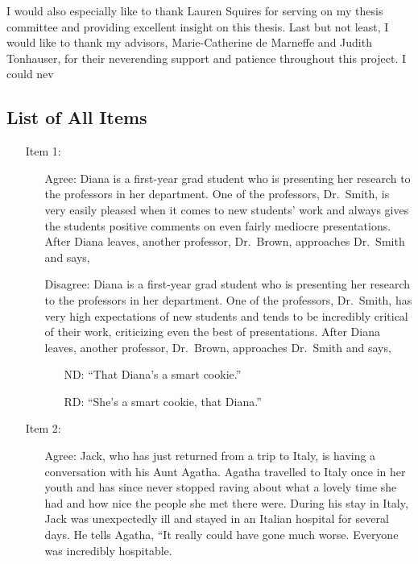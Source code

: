 \documentclass[titlepage,12pt]{article}
\begin{document}
I would also especially like to thank Lauren Squires for serving on my thesis committee and providing excellent insight on this thesis. Last but not least, I would like to thank my advisors, Marie-Catherine de Marneffe and Judith Tonhauser, for their neverending support and patience throughout this project. I could nev

\newpage
\begin{appendices}
\section{List of All Items} \label{alladem}

\begin{enumerate}
\footnotesize
    \item [Item 1:] \hfill
    \begin{enumerate}
        \item [Agree:] Diana is a first-year grad student who is presenting her research to the professors in her department. One of the professors, Dr.\ Smith, is very easily pleased when it comes to new students' work and always gives the students positive comments on even fairly mediocre presentations. After Diana leaves, another professor, Dr.\ Brown, approaches Dr.\ Smith and says,
        \item [Disagree:] Diana is a first-year grad student who is presenting her research to the professors in her department. One of the professors, Dr.\ Smith, has very high expectations of new students and tends to be incredibly critical of their work, criticizing even the best of presentations. After Diana leaves, another professor, Dr.\ Brown, approaches Dr.\ Smith and says,
        \begin{itemize}
        \setlength{\itemindent}{5em}
            \item [ND:] ``That Diana's a smart cookie.''
            \item [RD:] ``She's a smart cookie, that Diana.''
        \end{itemize}
    \end{enumerate} 
    \item [Item 2:] \hfill
    \begin{enumerate}
        \item [Agree:] Jack, who has just returned from a trip to Italy, is having a conversation with his Aunt Agatha. Agatha travelled to Italy once in her youth and has since never stopped raving about what a lovely time she had and how nice the people she met there were. During his stay in Italy, Jack was unexpectedly ill and stayed in an Italian hospital for several days. He tells Agatha, ``It really could have gone much worse. Everyone was incredibly hospitable.

\end{enumerate}
\end{enumerate}
\end{appendices}
\end{document}
